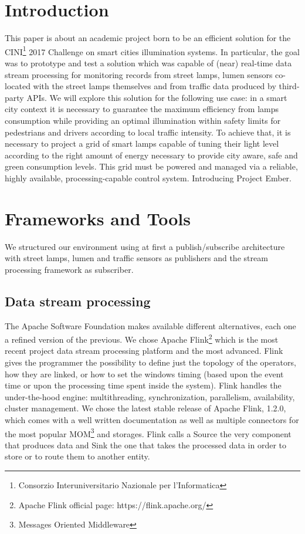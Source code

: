 \section{Introduction}
This paper is about an academic project born to be an efficient solution for the CINI\footnote{Consorzio Interuniversitario Nazionale per l'Informatica} 2017 Challenge on smart cities illumination systems. In particular, the goal was to prototype and test a solution which was capable of (near) real-time data stream processing for monitoring records from street lamps, lumen sensors co-located with the street lamps themselves and from traffic data produced by third-party APIs. We will explore this solution for the following use case: in a smart city context it is necessary to guarantee the maximum efficiency from lamps consumption while providing an optimal illumination within safety limits for pedestrians and drivers according to local traffic intensity. To achieve that, it is necessary to project a grid of smart lamps capable of tuning their light level according to the right amount of energy necessary to provide city aware, safe and green consumption levels. This grid must be powered and managed via a reliable, highly available, processing-capable control system. Introducing Project Ember.

\section{Frameworks and Tools}
We structured our environment using at first a publish/subscribe architecture with street lamps, lumen and traffic sensors as publishers and the stream processing framework as subscriber. 

\subsection{Data stream processing}
The Apache Software Foundation makes available different alternatives, each one a refined version of the previous. We chose Apache Flink\footnote{Apache Flink official page: https://flink.apache.org/} which is the most recent project data stream processing platform and the most advanced. Flink gives the programmer the possibility to define just the topology of the operators, how they are linked, or how to set the windows timing (based upon the event time or upon the processing time spent inside the system). Flink handles the under-the-hood engine: multithreading, synchronization, parallelism, availability, cluster management. We chose the latest stable release of Apache Flink, 1.2.0, which comes with a well written documentation as well as multiple connectors for the most popular MOM\footnote{Messages Oriented Middleware} and storages. Flink calls a Source the very component that produces data and Sink the one that takes the processed data in order to store or to route them to another entity.

